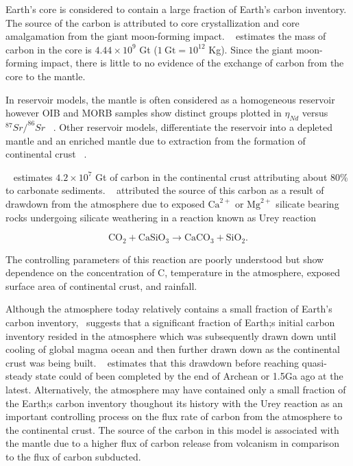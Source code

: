 Earth's core is considered to contain a large fraction of Earth's carbon inventory. The source of the carbon is attributed to core crystallization and core amalgamation from the giant moon-forming impact. ~\cite{DR-CH-SN:2013} estimates the mass of carbon in the core is $4.44 \times 10^9$ Gt ($1~\text{Gt} = 10^{12}$ Kg). Since the giant moon-forming impact, there is little to no evidence of the exchange of carbon from the core to the mantle. 

In reservoir models, the mantle is often considered as a homogeneous reservoir however OIB and MORB samples show distinct groups plotted in $\eta_{Nd}$ versus $^{87}Sr/^{86}Sr$ ~\cite{WWM:2015}. Other reservoir models, differentiate the reservoir into a depleted mantle and an enriched mantle due to extraction from the formation of continental crust ~\cite{KJB-JSB-ORJ:2002}. 

~\citet{KWH:1995} estimates $4.2 \times 10^7$ Gt of carbon in the continental crust attributing about 80\% to carbonate sediments. ~\citet{UHC:1952} attributed the source of this carbon as a result of drawdown from the atmosphere due to exposed $\mathrm{Ca}^{2+}$ or $\mathrm{Mg}^{2+}$ silicate bearing rocks undergoing silicate weathering in a reaction known as Urey reaction~\cite{UHC:1952}

\begin{equation}
\label{EQ:Urey_reaction}
  \text{CO}_2 + \text{CaSiO}_3 \rightarrow \text{CaCO}_3 + \text{SiO}_2.
\end{equation}

\noindent The controlling parameters of this reaction are poorly understood but show dependence on the concentration of C, temperature in the atmosphere, exposed surface area of continental crust, and rainfall.  

Although the atmosphere today relatively contains a small fraction of Earth's carbon inventory,~\citet{KJD:2002} suggests that a significant fraction of Earth;s initial carbon inventory resided in the atmosphere which was subsequently drawn down until cooling of global magma ocean and then further drawn down as the continental crust was being built. ~\citet{KHD:2002} estimates that this drawdown before reaching quasi-steady state could of been completed by the end of Archean or 1.5Ga ago at the latest. Alternatively, the atmosphere may have contained only a small fraction of the Earth;s carbon inventory thoughout its history with the Urey reaction as an important controlling process on the flux rate of carbon from the atmosphere to the continental crust. The source of the carbon in this model is associated with the mantle due to a higher flux of carbon release from volcanism in comparison to the flux of carbon subducted.

